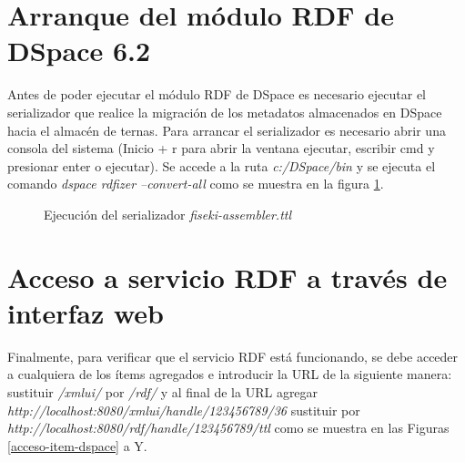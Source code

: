 \section{Arranque del módulo RDF de DSpace 6.2}

Antes de poder ejecutar el módulo RDF de DSpace es necesario ejecutar el serializador que realice la migración de los metadatos almacenados en DSpace hacia el almacén de ternas. Para arrancar el serializador es necesario abrir una consola del sistema (Inicio + r para abrir la ventana ejecutar, escribir cmd y presionar enter o ejecutar). Se accede a la ruta \textit{c:/DSpace/bin} y se ejecuta el comando \textit{dspace rdfizer –convert-all} como se muestra en la figura \ref{ejecucion-serializador-jena-fiseki}.

\begin{figure}[!ht]
	\centering
    \caption{Ejecución del serializador \textit{fiseki-assembler.ttl}}
    \label{ejecucion-serializador-jena-fiseki}
\end{figure}

\section{Acceso a servicio RDF a través de interfaz web}

Finalmente, para verificar que el servicio RDF está funcionando, se debe acceder a cualquiera de los ítems agregados e introducir la URL de la siguiente manera: sustituir \textit{/xmlui/} por \textit{/rdf/} y al final de la URL agregar \textit{http://localhost:8080/xmlui/handle/123456789/36} sustituir por \textit{http://localhost:8080/rdf/handle/123456789/ttl} como se muestra en las Figuras \ref{acceso-item-dspace} a Y.


